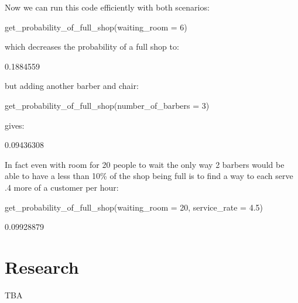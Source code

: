 Now we can run this code efficiently with both scenarios:

\begin{Rin}
get_probability_of_full_shop(waiting_room = 6)
\end{Rin}

which decreases the probability of a full shop to:

\begin{Rout}
[1] 0.1884559
\end{Rout}

but adding another barber and chair:

\begin{Rin}
get_probability_of_full_shop(number_of_barbers = 3)
\end{Rin}

gives:

\begin{Rout}
[1] 0.09436308
\end{Rout}

In fact even with room for 20 people to wait the only way 2 barbers would be
able to have a less than 10\% of the shop being full is to find a way to each
serve .4 more of a customer per hour:

\begin{Rin}
get_probability_of_full_shop(waiting_room = 20, service_rate = 4.5)
\end{Rin}

\begin{Rout}
[1] 0.09928879
\end{Rout}

\section{Research}\label{sec:research}

TBA
